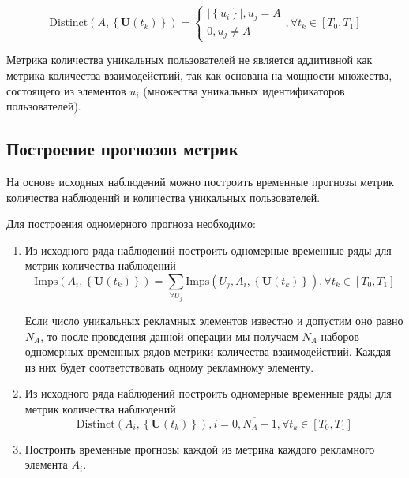     \begin{equation}
        \text{Distinct}\left( A, \left\{\mathbf{U}\left(t_k\right)\right\} \right) =
        \begin{cases}
            \left|\left\{u_i\right\}\right|, u_j = A  \\
            0, u_j \neq A
        \end{cases}, \forall t_k \in \left[T_0, T_1\right]
    \end{equation}

    Метрика количества уникальных пользователей не является аддитивной как метрика количества взаимодействий,
    так как основана на мощности множества, состоящего из элементов $u_i$ (множества уникальных 
    идентификаторов пользователей). 

\subsection{Построение прогнозов метрик}

На основе исходных наблюдений можно построить временные прогнозы метрик количества наблюдений и
количества уникальных пользователей.

Для построения одномерного прогноза необходимо:
\begin{enumerate}
    \item Из исходного ряда наблюдений построить одномерные временные ряды для метрик количества
    наблюдений
    \begin{equation}
        \text{Imps} \left(A_i, \left\{\mathbf{U}\left(t_k\right)\right\} \right) 
        = \sum \limits_{\forall U_j} \text{Imps} \left( U_j, A_i, \left\{\mathbf{U}\left(t_k\right)\right\} \right), 
        \forall t_k \in \left[T_0, T_1\right]
    \end{equation}

    Если число уникальных рекламных элементов известно и допустим оно равно $N_A$, то после проведения данной операции
    мы получаем $N_A$ наборов одномерных временных рядов метрики количества взаимодействий. Каждая из них будет
    соответствовать одному рекламному элементу.

    \item Из исходного ряда наблюдений построить одномерные временные ряды для метрик количества
    наблюдений
    \begin{equation}
        \text{Distinct}\left( A_i, \left\{\mathbf{U}\left(t_k\right)\right\} \right), i = \overline{0, N_A - 1}, \forall t_k \in \left[T_0, T_1\right]
    \end{equation}

    \item Построить временные прогнозы каждой из метрика каждого рекламного элемента $A_i$.
\end{enumerate}

